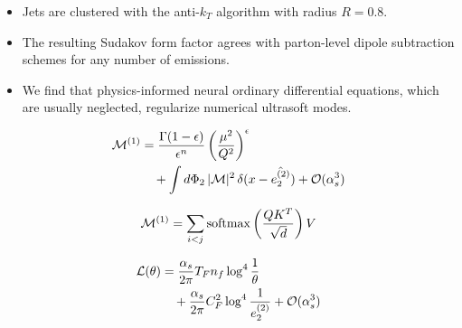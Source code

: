 \begin{itemize}
  \item Jets are clustered with the anti-$k_T$ algorithm with radius $R = 0.8$.
  \item The resulting Sudakov form factor agrees with parton-level dipole subtraction schemes for any number of emissions.
  \item We find that physics-informed neural ordinary differential equations, which are usually neglected, regularize numerical ultrasoft modes.
\end{itemize}

\begin{align}
  \mathcal{M}^{(1)} &= \frac{\Gamma(1-\epsilon)}{\epsilon^{n}} \left(\frac{\mu^2}{Q^2}\right)^{\epsilon} \nonumber \\
  &\quad + \int d\Phi_{2} \, |\mathcal{M}|^2 \, \delta(x - \hat{e_2^{(2)}}) + \mathcal{O}(\alpha_s^3) \label{eq:2}
\end{align}

\begin{equation}
  \mathcal{M}^{(1)} = \sum_{i<j} \mathrm{softmax}\left(\frac{Q K^T}{\sqrt{d}}\right) V
  \label{eq:3}
\end{equation}

\begin{align}
  \mathcal{L}(\theta) &= \frac{\alpha_s}{2\pi} T_F n_f \log^{4} \frac{1}{\theta} \nonumber \\
  &\quad + \frac{\alpha_s}{2\pi} C_F^2 \log^{4} \frac{1}{e_2^{(2)}} + \mathcal{O}(\alpha_s^3) \label{eq:4}
\end{align}

